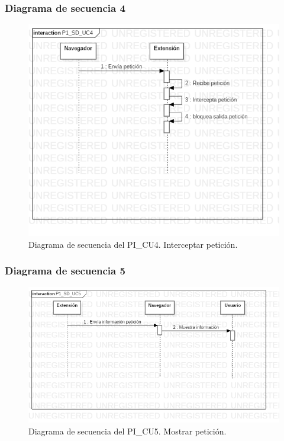 \documentclass[12pt, a4paper, titlepage]{report}
\begin{document}
			    \subsubsection{Diagrama de secuencia 4}
			    \begin{figure}[H]
				    \begin{center} \includegraphics[width=15cm]{./imagenes/Desarrollo/Prototipo_1/P1_SD_UC4.png}
				    \caption[Diagrama de secuencia 4 del Prototipo I]{Diagrama de secuencia del PI\_CU4. Interceptar petición.}
			        \end{center}
			    \end{figure}
			    \subsubsection{Diagrama de secuencia 5}
			    \begin{figure}[H]
				    \begin{center} \includegraphics[width=15cm]{./imagenes/Desarrollo/Prototipo_1/P1_SD_UC5.png}
				    \caption[Diagrama de secuencia 5 del Prototipo I]{Diagrama de secuencia del PI\_CU5. Mostrar petición.}
			        \end{center}
			    \end{figure}
			        
\end{document}

